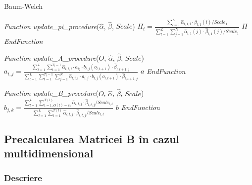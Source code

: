 \documentclass[12pt]{article}
\begin{document}
\begin{algorithm}[H]
  \caption{Baum-Welch}
  \label{alg-baum-welch-2}
  \begin{algorithmic}[1]
    \STATE \emph{Function update\_pi\_procedure}($\hat{\alpha}$,
    $\hat{\beta}$, $Scale$)  \STATE $\Pi_i =
    \frac{\displaystyle\sum_{l=1}^{L}\hat{\alpha}_{l,1,i} \cdot
      \hat{\beta}_{l,1}(i) / Scale_1}
    {\displaystyle\sum_{l=1}^{L}\sum_{j=1}^{N}{\hat{\alpha}_{l,1}(j)
        \cdot \hat{\beta}_{l,1}(j) / Scale_1}}$
    \ENDFOR
    \RETURN $\Pi$ \STATE \emph{EndFunction}
  \end{algorithmic}

  \begin{algorithmic}[1]
    \vspace*{0.5em} \STATE \emph{Function update\_A\_procedure}($O$,
    $\hat{\alpha}$, $\hat{\beta}$, $Scale$) 
     \STATE $a_{i,j} =
    \frac{\displaystyle\sum_{l=1}^{L}\sum_{t=1}^{T_l-1}{
        \hat{\alpha}_{l,t,i}\cdot a_{ij} \cdot b_{l,j}(o_{l,t+1}) \cdot
        \hat{\beta}_{l,t+1,j}}}
    {\displaystyle\sum_{l=1}^{L}\sum_{t=1}^{T_l-1}\sum_{j=1}^{N}{\hat{\alpha}_{l,t,i}\cdot
        a_{i,j} \cdot b_{l,j}(o_{l,t+1}) \cdot \hat{\beta}_{l,t+1,j}}}$
    \ENDFOR
    \ENDFOR
    \RETURN $a$ \STATE \emph{EndFunction}
  \end{algorithmic}

  \begin{algorithmic}[1]
    \vspace*{0.5em} \STATE \emph{Function update\_B\_procedure}($O$, $\hat{\alpha}$,
    $\hat{\beta}$, $Scale$)  
    \STATE $b_{j,k} =
    \frac{\displaystyle\sum_{l=1}^{L}\sum_{t=1,O(t)=v_k}^{T(l)}
      {\hat{\alpha}_{l,t,j} \cdot \hat{\beta}_{l,t,j} / Scale_{l,t}}}
    {\displaystyle\sum_{l=1}^{L}\sum_{t=1}^{T(l)}
      {\hat{\alpha}_{l,t,j} \cdot \hat{\beta}_{l,t,j} / Scale_{l,t}}}$
    \ENDFOR
    \ENDFOR
    \RETURN $b$ \STATE \emph{EndFunction}
  \end{algorithmic}
\end{algorithm}

\subsection{Precalcularea Matricei B în cazul multidimensional}
\label{sec:b-matrix-precom}


\subsubsection{Descriere}
\end{document}

